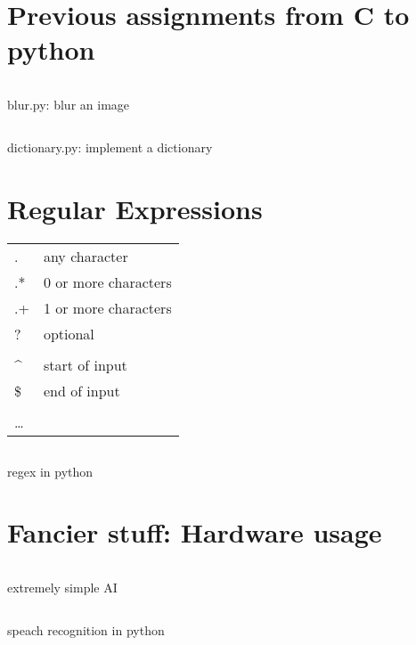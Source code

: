 \clearpage
\section{Previous assignments from C to python}
\begin{code}
	\inputminted{python}{codes/src6/6/filter/blur.py}
	\caption{blur.py: blur an image}
\end{code}
\begin{code}
	\inputminted{python}{codes/src6/6/speller/dictionary.py}
	\caption{dictionary.py: implement a dictionary}
\end{code}

\section{Regular Expressions}
\begin{tabular}{l l}
	.    & any character        \\
	.*   & 0 or more characters \\
	.+   & 1 or more characters \\
	?    & optional             \\
	\\
	\^{} & start of input       \\
	\$   & end of input         \\
	\\
	\dots
\end{tabular}
\begin{code}
	\inputminted{python}{codes/src6/1/agree2.py}
	\caption{regex in python}
\end{code}

\clearpage
\section{Fancier stuff: Hardware usage}
\begin{code}
	\inputminted{python}{codes/src6/6/voices/voices0.py}
	\caption{extremely simple AI}
\end{code}

\begin{code}
	\inputminted{python}{codes/src6/6/voices/voices1.py}
	\caption{speach recognition in python}
\end{code}

